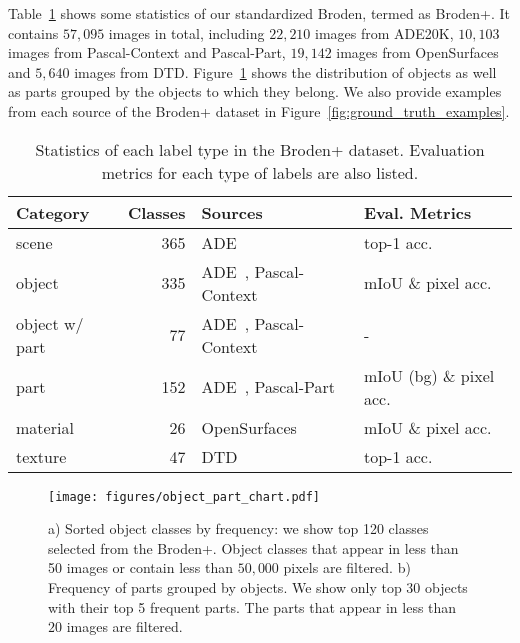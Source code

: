 \documentclass[runningheads]{llncs}
\begin{document}
Table~\ref{tab:modified_broden_label_statistics} shows some statistics of our standardized Broden, termed as Broden+. It contains $57,095$ images in total, including $22,210$ images from ADE20K, $10,103$ images from Pascal-Context and Pascal-Part, $19,142$ images from OpenSurfaces and $5,640$ images from DTD. Figure~\ref{fig:object_part_statistics} shows the distribution of objects as well as parts grouped by the objects to which they belong. We also provide examples from each source of the Broden+ dataset in Figure~\ref{fig:ground_truth_examples}. 


\begin{table}[!tbp]
\begin{center}
\setlength{\tabcolsep}{5.8pt}
\begin{tabular}{ l r l l}
\toprule[0.8pt]
\textbf{Category} & \textbf{Classes} & \textbf{Sources} & \textbf{Eval. Metrics} \\
\hline
scene & 365 & ADE~\cite{zhou2017scene} & top-1 acc. \\
object & 335 & ADE~\cite{zhou2017scene}, Pascal-Context\cite{mottaghi_cvpr14} & mIoU \& pixel acc. \\
object w/ part & 77 & ADE~\cite{zhou2017scene}, Pascal-Context\cite{mottaghi_cvpr14} & - \\
part & 152 & ADE~\cite{zhou2017scene}, Pascal-Part~\cite{chen_cvpr14} & mIoU (bg) \& pixel acc. \\
material & 26 & OpenSurfaces~\cite{bell2013opensurfaces} & mIoU \& pixel acc. \\
texture & 47 & DTD~\cite{cimpoi2014describing} & top-1 acc. \\
\bottomrule[0.8pt]
\end{tabular}
\end{center}
\caption{Statistics of each label type in the Broden+ dataset. Evaluation metrics for each type of labels are also listed.}
\label{tab:modified_broden_label_statistics}
\end{table}

\begin{figure}[!t]
\centering
\texttt{[image: figures/object\_part\_chart.pdf]}
\caption{a) Sorted object classes by frequency: we show top 120 classes selected from the Broden+. Object classes that appear in less than 50 images or contain less than $50,000$ pixels are filtered. b) Frequency of parts grouped by objects. We show only top 30 objects with their top 5 frequent parts. The parts that appear in less than $20$ images are filtered.}
\label{fig:object_part_statistics}
\end{figure}
\end{document}

